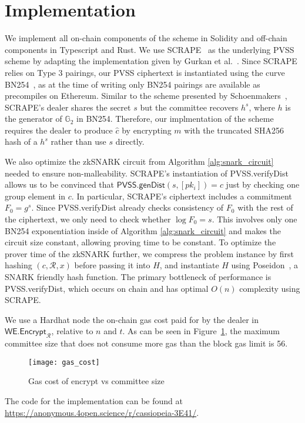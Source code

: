 \section{Implementation}

We implement all on-chain components of the scheme in Solidity and off-chain components in Typescript and Rust.
We use SCRAPE~\cite{pvss_scrape} as the underlying PVSS scheme by adapting the implementation given by Gurkan et al.~\cite{aggregatable_dkg}.
Since SCRAPE relies on Type 3 pairings, our PVSS ciphertext is instantiated using the curve BN254~\cite{bn254}, as at the time of writing only BN254 pairings are available as precompiles on Ethereum.
Similar to the scheme presented by Schoenmakers~\cite{pvss_schoenmakers}, SCRAPE's dealer shares the secret $s$ but the committee recovers $h^s$, where $h$ is the generator of $\mathbb{G}_2$ in BN254.
Therefore, our implmentation of the scheme requires the dealer to produce $\hat{c}$ by encrypting $m$ with the truncated SHA256 hash of a $h^s$ rather than use $s$ directly.

We also optimize the zkSNARK circuit from Algorithm \ref{alg:snark_circuit} needed to ensure non-malleability.
SCRAPE's instantiation of \textsf{PVSS.verifyDist} allows us to be convinced that $\textsf{PVSS.genDist}(s, [pk_i]) = c$ just by checking one group element in $c$.
In particular, SCRAPE's ciphertext includes a commitment $F_0 = g^s$.
Since \textsf{PVSS.verifyDist} already checks consistency of $F_0$ with the rest of the ciphertext, we only need to check whether $\log F_0 = s$.
This involves only one BN254 exponentiation inside of Algorithm \ref{alg:snark_circuit} and makes the circuit size constant, allowing proving time to be constant.
To optimize the prover time of the zkSNARK further, we compress the problem instance by first hashing $(c, \mathcal{R}, x)$ before passing it into $H$, and instantiate $H$ using Poseidon~\cite{poseidon}, a SNARK friendly hash function.
The primary bottleneck of performance is \textsf{PVSS.verifyDist}, which occurs on chain and has optimal $O(n)$ complexity using SCRAPE.


We use a Hardhat node the on-chain gas cost paid for by the dealer in $\textsf{WE.Encrypt}_\mathcal{R}$, relative to $n$ and $t$.
As can be seen in Figure~\ref{fig:gas_cost}, the maximum committee size that does not consume more gas than the block gas limit is 56. 
\begin{figure}\label{fig:gas_cost}
\caption{Gas cost of \textsf{encrypt} vs committee size}
\texttt{[image: gas\_cost]}
\end{figure}


The code for the implementation can be found at \url{https://anonymous.4open.science/r/cassiopeia-3E41/}.
